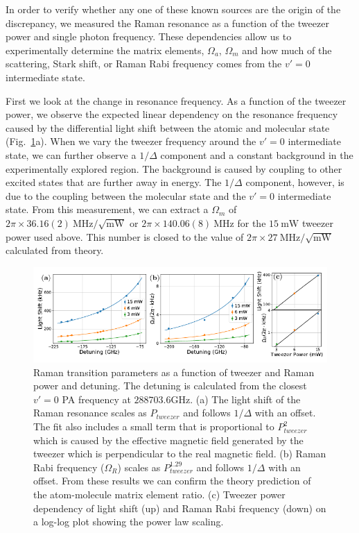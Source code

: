 \documentclass[aps,prl,twocolumn,superscriptaddress]{revtex4-1}
\newcommand{\todo}[1]{}
\begin{document}
In order to verify whether any one of these known sources are the origin of the discrepancy,
we measured the Raman resonance as a function of the tweezer power and single photon frequency.
These dependencies allow us to experimentally determine the matrix elements,
$ \Omega_a $, $\Omega_m $ and how much of the scattering, Stark shift,
or Raman Rabi frequency comes from the $ v' = 0$ intermediate state.

First we look at the change in resonance frequency.
As a function of the tweezer power,
we observe the expected linear dependency on the resonance frequency
caused by the differential light shift between the atomic and molecular state (Fig.~\ref{f-det}a).
When we vary the tweezer frequency around the $v'=0$ intermediate state,
we can further observe a $1/\Delta$ component
and a constant background in the experimentally explored region.
The background is caused by coupling to other excited states that are further away in energy.
The $1/\Delta$ component, however, is due to the coupling between the molecular state
and the $v'=0$ intermediate state.
From this measurement, we can extract a $\Omega_m$ of
$2\pi\times36.16(2) ~\mathrm{MHz}/\sqrt{\mathrm{mW}}$ or
$2\pi\times140.06(8) ~\mathrm{MHz}$ for the $15 ~\mathrm{mW}$ tweezer power used above.
This number is closed to the value of
$2\pi\times27 ~\mathrm{MHz}/\sqrt{\mathrm{mW}}$ calculated from theory. \todo{ref/sm theory}

\begin{figure}
  \includegraphics[width=\textwidth]{fig4.pdf}
  \caption{Raman transition parameters as a function of tweezer and Raman power and detuning.
    The detuning is calculated from the closest $v'=0$ PA frequency at $288703.6\mathrm{GHz}$.
    (a) The light shift of the Raman resonance scales as $P_{tweezer}$
    and follows $1/\Delta$ with an offset.
    The fit also includes a small term that is proportional to $P_{tweezer}^2$
    which is caused by the effective magnetic field generated by the tweezer which is
    perpendicular to the real magnetic field.
    (b) Raman Rabi frequency ($\Omega_R$) scales as $P_{tweezer}^{1.29}$
    and follows $1/\Delta$ with an offset.
    From these results we can confirm the theory prediction of
    the atom-molecule matrix element ratio.
    (c) Tweezer power dependency of light shift (up) and Raman Rabi frequency (down)
    on a log-log plot showing the power law scaling.
    \label{f-det}}
\end{figure}
\end{document}
